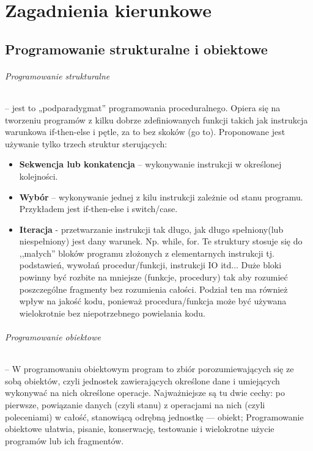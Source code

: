 \documentclass[a4paper,twoside]{report}
\begin{document}
\part{Zagadnienia kierunkowe}
\bigskip
\chapter{Programowanie strukturalne i obiektowe}
\paragraph{Programowanie strukturalne} – jest to „podparadygmat” programowania proceduralnego. Opiera się na tworzeniu programów z kilku dobrze zdefiniowanych funkcji takich jak instrukcja warunkowa if-then-else i pętle, za to bez skoków (go to). Proponowane jest używanie tylko trzech struktur sterujących:
\begin{itemize}
\item \textbf{Sekwencja lub konkatencja} – wykonywanie instrukcji w określonej kolejności.
\item \textbf{Wybór} – wykonywanie jednej z kilu instrukcji zależnie od stanu programu. Przykładem jest if-then-else i switch/case.
\item \textbf{Iteracja} - przetwarzanie instrukcji tak długo, jak długo spełniony(lub niespełniony) jest dany warunek. Np. while, for.
Te struktury stosuje się do ,,małych'' bloków programu złożonych z elementarnych instrukcji tj. podstawień, wywołań procedur/funkcji, instrukcji IO itd... Duże bloki powinny być rozbite na mniejsze (funkcje, procedury) tak aby rozumieć poszczególne fragmenty bez rozumienia całości. Podział ten ma również wpływ na jakość kodu, ponieważ procedura/funkcja może być używana wielokrotnie bez niepotrzebnego powielania kodu.
\end{itemize}
\medskip 

\paragraph{Programowanie obiektowe}
 – W programowaniu obiektowym program to zbiór porozumiewających się ze sobą obiektów, czyli jednostek zawierających określone dane i umiejących wykonywać na nich określone operacje. Najważniejsze są tu dwie cechy: po pierwsze, powiązanie danych (czyli stanu) z operacjami na nich (czyli poleceniami) w całość, stanowiącą odrębną jednostkę — obiekt; Programowanie obiektowe ułatwia, pisanie, konserwację, testowanie i wielokrotne użycie programów lub ich fragmentów.
\medskip 
\end{document}
